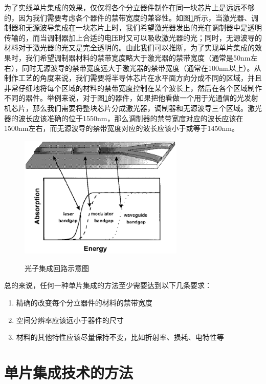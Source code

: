\documentclass{ZJUthesis}
\begin{document}
为了实线单片集成的效果，仅仅将各个分立器件制作在同一块芯片上是远远不够的，因为我们需要考虑各个器件的禁带宽度的兼容性。如图\ref{fig_pic}所示，当激光器、调制器和无源波导集成在一块芯片上时，我们希望激光器发出的光在调制器中是透明传输的，而当调制器加上合适的电压时又可以吸收激光器的光；同时，无源波导的材料对于激光器的光又是完全透明的。由此我们可以推断，为了实现单片集成的效果时，我们希望调制器材料的禁带宽度略大于激光器的禁带宽度（通常是50nm左右），同时无源波导的禁带宽度远大于激光器的禁带宽度（通常在100nm以上）。从制作工艺的角度来说，我们需要将半导体芯片在水平面方向分成不同的区域，并且非常仔细地将每个区域的材料的禁带宽度控制在某个波长上，然后在各个区域制作不同的器件。举例来说，对于图\ref{fig_pic}的器件，如果把他看做一个用于光通信的光发射机芯片，那么我们需要将整块芯片分成激光器，调制器和无源波导三个区域。激光器的波长应该准确的位于1550nm，那么调制器的禁带宽度对应的波长应该在1500nm左右，而无源波导的禁带宽度对应的波长应该小于或等于1450nm。

\begin{figure}[htb]
  \centering
  \includegraphics[width=0.7\textwidth]{./Pictures/pic.eps}\\
  \caption{光子集成回路示意图}
  \label{fig_pic}
\end{figure}

总的来说，任何一种单片集成的方法至少需要达到以下几条要求：

\begin{enumerate}
\item{精确的改变每个分立器件的材料的禁带宽度}
\item{空间分辨率应该远小于器件的尺寸}
\item{材料的其他特性应该尽量保持不变，比如折射率、损耗、电特性等}
\end{enumerate}

\section{单片集成技术的方法}
\end{document}
